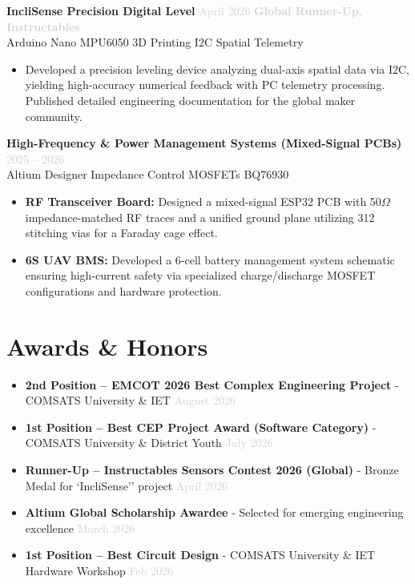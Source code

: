 \documentclass[a4paper,10pt]{article}
\newcommand{\cvaward}[3]{%
  \textbf{#1} - {\small #2} \hfill {\small\textcolor{lightgray}{#3}}
}
\begin{document}
\textbf{IncliSense Precision Digital Level} \hfill {\small\textcolor{lightgray}{April 2026 \enspace\textbar\enspace \textbf{Global Runner-Up, Instructables}}}\\
{\small Arduino Nano \textbar{} MPU6050 \textbar{} 3D Printing \textbar{} I2C \textbar{} Spatial Telemetry}
\begin{itemize}
  \item Developed a precision leveling device analyzing dual-axis spatial data via I2C, yielding high-accuracy numerical feedback with PC telemetry processing. Published detailed engineering documentation for the global maker community.
\end{itemize}
\vspace{3pt}

\textbf{High-Frequency \& Power Management Systems (Mixed-Signal PCBs)} \hfill {\small\textcolor{lightgray}{2025 -- 2026}}\\
{\small Altium Designer \textbar{} Impedance Control \textbar{} MOSFETs \textbar{} BQ76930}
\begin{itemize}
  \item \textbf{RF Transceiver Board:} Designed a mixed-signal ESP32 PCB with 50$\Omega$ impedance-matched RF traces and a unified ground plane utilizing 312 stitching vias for a Faraday cage effect.
  \item \textbf{6S UAV BMS:} Developed a 6-cell battery management system schematic ensuring high-current safety via specialized charge/discharge MOSFET configurations and hardware protection.
\end{itemize}

\section{Awards \& Honors}
\begin{itemize}
  \item \cvaward{2nd Position -- EMCOT 2026 Best Complex Engineering Project}{COMSATS University \& IET}{August 2026}
  \item \cvaward{1st Position -- Best CEP Project Award (Software Category)}{COMSATS University \& District Youth}{July 2026}
  \item \cvaward{Runner-Up -- Instructables Sensors Contest 2026 (Global)}{Bronze Medal for `IncliSense'' project}{April 2026}
  \item \cvaward{Altium Global Scholarship Awardee}{Selected for emerging engineering excellence}{March 2026}
  \item \cvaward{1st Position -- Best Circuit Design}{COMSATS University \& IET Hardware Workshop}{Feb 2026}
\end{itemize}
\end{document}
